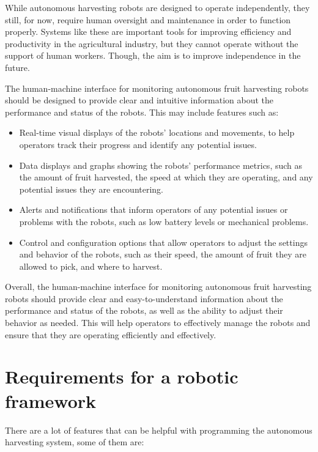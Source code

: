 \documentclass[%
oneside,    %
project,    %
nosummary   %
]{USN-MSc}
\begin{document}
While autonomous harvesting robots are designed to operate independently, they still, for now, require human oversight and maintenance in order to function properly. Systems like these are important tools for improving efficiency and productivity in the agricultural industry, but they cannot operate without the support of human workers. Though, the aim is to improve independence in the future.

The human-machine interface for monitoring autonomous fruit harvesting robots should be designed to provide clear and intuitive information about the performance and status of the robots. This may include features such as:

\begin{itemize}
  \item Real-time visual displays of the robots' locations and movements, to help operators track their progress and identify any potential issues.

  \item Data displays and graphs showing the robots' performance metrics, such as the amount of fruit harvested, the speed at which they are operating, and any potential issues they are encountering.

  \item Alerts and notifications that inform operators of any potential issues or problems with the robots, such as low battery levels or mechanical problems.

  \item Control and configuration options that allow operators to adjust the settings and behavior of the robots, such as their speed, the amount of fruit they are allowed to pick, and where to harvest.
\end{itemize}

Overall, the human-machine interface for monitoring autonomous fruit harvesting robots should provide clear and easy-to-understand information about the performance and status of the robots, as well as the ability to adjust their behavior as needed. This will help operators to effectively manage the robots and ensure that they are operating efficiently and effectively.

\section{Requirements for a robotic framework}
There are a lot of features that can be helpful with programming the autonomous harvesting system, some of them are:
\end{document}

